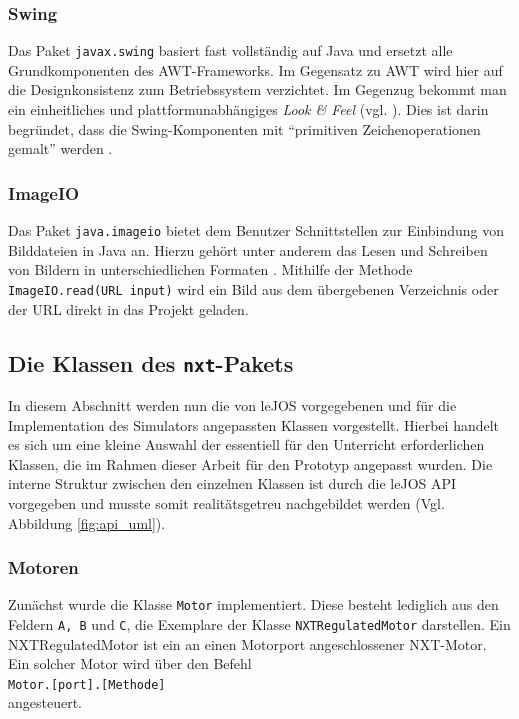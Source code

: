 \documentclass[paper=a4, DIV=calc, BCOR=12mm, twoside=on, onecolumn=on, open = right, titlepage =on, parskip =half-, headsepline = on, footsepline = off, chapterprefix = off, appendixprefix = on, fontsize = 12pt, numbers = noenddot, abstract = on]{scrbook}
\begin{document}
\subsubsection*{Swing}

Das Paket \texttt{javax.swing} basiert fast vollständig auf Java und ersetzt alle Grundkomponenten des AWT-Frameworks. Im Gegensatz zu AWT wird hier auf die Designkonsistenz zum Betriebssystem verzichtet. Im Gegenzug bekommt man ein einheitliches und plattformunabhängiges \emph{Look \& Feel} (vgl. \cite[S.279]{abts:15}). Dies ist darin begründet, dass die Swing-Komponenten mit "`primitiven Zeichenoperationen gemalt"' werden \cite[S.1018]{ullenboom:12}.


\subsubsection*{ImageIO}

Das Paket \texttt{java.imageio} bietet dem Benutzer Schnittstellen zur Einbindung von Bilddateien in Java an. Hierzu gehört unter anderem das Lesen und Schreiben von Bildern in unterschiedlichen Formaten \cite[S.1280]{ullenboom:12}. Mithilfe der Methode \texttt{ImageIO.read(URL input)} wird ein Bild aus dem übergebenen Verzeichnis oder der URL direkt in das Projekt geladen. 


\par \singlespacing
\subsection{Die Klassen des \texttt{nxt}-Pakets}
\label{sec:API}
\onehalfspacing
In diesem Abschnitt werden nun die von leJOS vorgegebenen und für die Implementation des Simulators angepassten Klassen vorgestellt. Hierbei handelt es sich um eine kleine Auswahl der essentiell für den Unterricht erforderlichen Klassen, die im Rahmen dieser Arbeit für den Prototyp angepasst wurden. Die interne Struktur zwischen den einzelnen Klassen ist durch die leJOS API vorgegeben und musste somit realitätsgetreu nachgebildet werden (Vgl. Abbildung \ref{fig:api_uml}).

\subsubsection{Motoren}
Zunächst wurde die Klasse \texttt{Motor} implementiert. Diese besteht lediglich aus den Feldern \texttt{A, B} und \texttt{C}, die Exemplare der Klasse \texttt{NXTRegulatedMo\-tor} darstellen. Ein NXTRegulatedMotor ist ein an einen Motorport angeschlossener NXT-Motor. Ein solcher Motor wird über den Befehl\\
\hspace*{2em} \texttt{Motor.[port].[Methode]}\\
angesteuert. 
\end{document}
